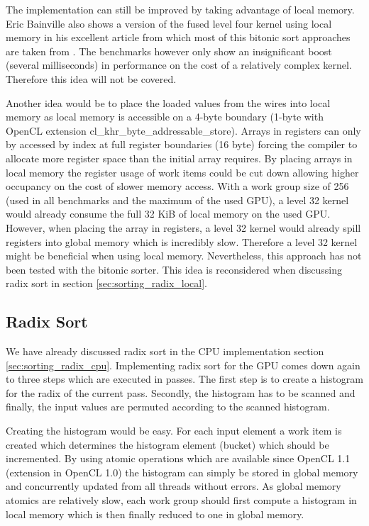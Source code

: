 The implementation can still be improved by taking advantage of local memory. Eric Bainville also shows a version of the fused level four kernel using local memory in his excellent article from which most of this bitonic sort approaches are taken from \cite{sort_bealto}. The benchmarks however only show an insignificant boost (several milliseconds) in performance on the cost of a relatively complex kernel. Therefore this idea will not be covered.

Another idea would be to place the loaded values from the wires into local memory as local memory is accessible on a 4-byte boundary (1-byte with OpenCL extension cl\_khr\_byte\_addressable\_store). Arrays in registers can only by accessed by index at full register boundaries (16 byte) forcing the compiler to allocate more register space than the initial array requires. By placing arrays in local memory the register usage of work items could be cut down allowing higher occupancy on the cost of slower memory access. With a work group size of 256 (used in all benchmarks and the maximum of the used GPU), a level 32 kernel would already consume the full 32 KiB of local memory on the used GPU. However, when placing the array in registers, a level 32 kernel would already spill registers into global memory which is incredibly slow. Therefore a level 32 kernel might be beneficial when using local memory. Nevertheless, this approach has not been tested with the bitonic sorter. This idea is reconsidered when discussing radix sort in section \ref{sec:sorting_radix_local}.


\subsection{Radix Sort}
\label{sec:sorting_radix}

We have already discussed radix sort in the CPU implementation section \ref{sec:sorting_radix_cpu}. Implementing radix sort for the GPU comes down again to three steps which are executed in passes. The first step is to create a histogram for the radix of the current pass. Secondly, the histogram has to be scanned and finally, the input values are permuted according to the scanned histogram.

Creating the histogram would be easy. For each input element a work item is created which determines the histogram element (bucket) which should be incremented. By using atomic operations which are available since OpenCL 1.1 (extension in OpenCL 1.0) the histogram can simply be stored in global memory and concurrently updated from all threads without errors. As global memory atomics are relatively slow, each work group should first compute a histogram in local memory which is then finally reduced to one in global memory.


